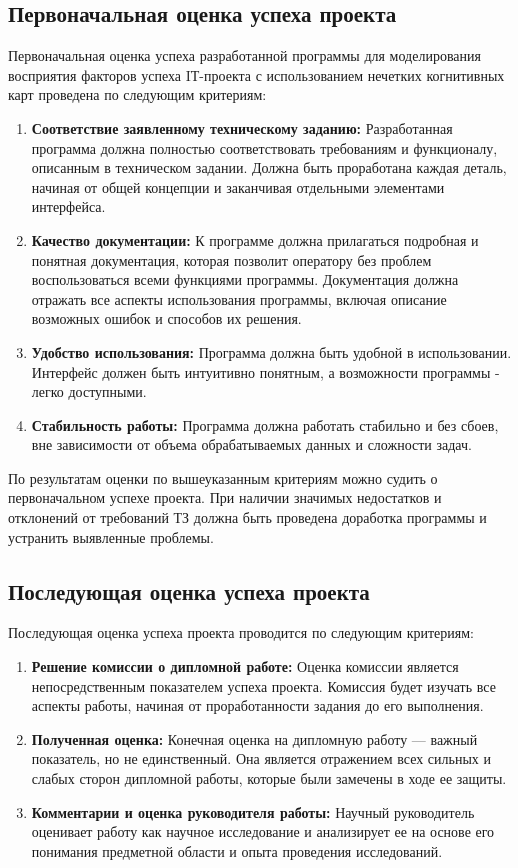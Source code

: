 \documentclass{article}
\begin{document}
    \subsection {Первоначальная оценка успеха проекта}
    Первоначальная оценка успеха разработанной программы для моделирования восприятия факторов успеха IТ-проекта с использованием нечетких когнитивных карт проведена по следующим критериям:
    \begin{enumerate}
        \item \textbf{Соответствие заявленному техническому заданию:} Разработанная программа должна полностью соответствовать требованиям и функционалу, описанным в техническом задании. Должна быть проработана каждая деталь, начиная от общей концепции и заканчивая отдельными элементами интерфейса.
        \item \textbf{Качество документации:} К программе должна прилагаться подробная и понятная документация, которая позволит оператору без проблем воспользоваться всеми функциями программы. Документация должна отражать все аспекты использования программы, включая описание возможных ошибок и способов их решения.
        \item \textbf{Удобство использования:} Программа должна быть удобной в использовании. Интерфейс должен быть интуитивно понятным, а возможности программы - легко доступными.
        \item \textbf{Стабильность работы:} Программа должна работать стабильно и без сбоев, вне зависимости от объема обрабатываемых данных и сложности задач.
    \end{enumerate}
    По результатам оценки по вышеуказанным критериям можно судить о первоначальном успехе проекта. При наличии значимых недостатков и отклонений от требований ТЗ должна быть проведена доработка программы и устранить выявленные проблемы.
        \subsection {Последующая оценка успеха проекта}
    Последующая оценка успеха проекта проводится по следующим критериям:
    \begin{enumerate}
        \item \textbf{Решение комиссии о дипломной работе:} Оценка комиссии является непосредственным показателем успеха проекта. Комиссия будет изучать все аспекты работы, начиная от проработанности задания до его выполнения.

        \item \textbf{Полученная оценка:} Конечная оценка на дипломную работу — важный показатель, но не единственный. Она является отражением всех сильных и слабых сторон дипломной работы, которые были замечены в ходе ее защиты.

        \item \textbf{Комментарии и оценка руководителя работы:} Научный руководитель оценивает работу как научное исследование и анализирует ее на основе его понимания предметной области и опыта проведения исследований.
    \end{enumerate}
\end{document}
